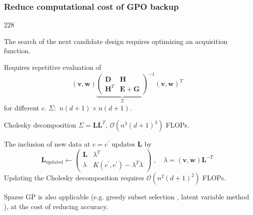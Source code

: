 \documentclass{beamer}
\let\oldcite=\cite
\renewcommand{\cite}[1]{\textcolor[rgb]{.4,.4,.85}{\oldcite{#1}}}
\newcommand{\barrow}{\item[\color{darkred}\ding{228}]}
\begin{document}
\begin{frame}
    \frametitle{Reduce computational cost of GPO \hfill \scriptsize{backup}}\small
    \begin{dinglist}{228}
        \barrow The search of the next candidate design requires optimizing an acquisition function.
        \barrow Requires repetitive evaluation of 
                \begin{equation*}
                    (\mathbf{v}, \mathbf{w})
                    {\underbrace{\begin{pmatrix}
                        \mathbf{D} & \mathbf{H}\\
                        \mathbf{H}^T & \mathbf{E} + \mathbf{G}
                    \end{pmatrix}}_{{\Sigma}}}^{-1}
                    (\mathbf{v}, \mathbf{w})^T
                \end{equation*}
                for different $c$. $\Sigma:$ $n(d+1)\times n(d+1)$.
        \barrow Cholesky decomposition $\Sigma = \mathbf{L}\mathbf{L}^T$, $ \mathcal{O}(n^3(d+1)^3)$ FLOPs. 
        \barrow The inclusion of new data at $c=c^\prime$ updates $\mathbf{L}$ by
        $$
            \mathbf{L}_{\textrm{updated}}\leftarrow 
            \begin{pmatrix}
                \mathbf{L} & \lambda^T\\
                \lambda  & K(c^\prime,c^\prime) - \lambda^T\lambda
            \end{pmatrix}\;,\quad
            \lambda = (\mathbf{v}, \mathbf{w})\mathbf{L}^{-T}
        $$
        Updating the Cholesky decomposition requires $ \mathcal{O}(n^2(d+1)^2)$ FLOPs.
        \barrow
        Sparse GP is also applicable (e.g. greedy subset selection \scriptsize \cite{Smola 01}, 
        \small latent variable method \scriptsize \cite{Lawrence 04} \small), 
        at the cost of reducing accuracy.
    \end{dinglist}
\end{frame}
\end{document}
